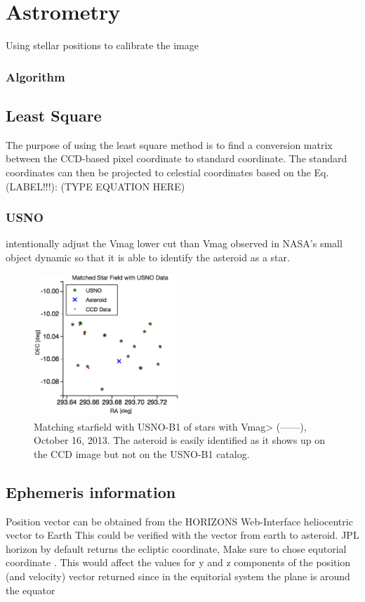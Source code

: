 \documentclass[authoryear, 12pt,5p, times]{elsarticle}
\begin{document}
\section{Astrometry}
Using stellar positions to calibrate the image
		\subsubsection{Algorithm}
	\subsection{Least Square}\label{ls}
	The purpose of using the least square method is to find a conversion matrix between the CCD-based pixel coordinate to standard coordinate.
	The standard coordinates can then be projected to celestial coordinates based on the Eq. (LABEL!!!):
	(TYPE EQUATION HERE)
	\subsubsection{USNO}
	intentionally adjust the Vmag lower cut than Vmag observed in NASA's small object dynamic so that it is able to identify the asteroid as a star.
	\begin{figure}[h!]
\includegraphics[width=0.5\textwidth]{figures/starfield_match}
\caption{ Matching starfield with USNO-B1 of stars with Vmag>  (------), October 16, 2013. The asteroid is easily identified as it shows up on the CCD image but not on the USNO-B1 catalog.}
\label{starfield_match}
\end{figure}
	\subsection{Ephemeris information}	
Position vector can be obtained from the HORIZONS Web-Interface 
heliocentric vector to Earth
This could be verified with the vector from earth to asteroid.
	JPL horizon by default returns the ecliptic coordinate, Make sure to chose equtorial coordinate . This would affect the values for y and z components of the position (and velocity) vector returned since in the equitorial system the plane is around the equator
	
\end{document}
